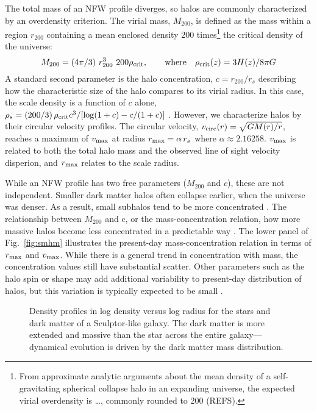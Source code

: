 The total mass of an NFW profile diverges, so halos are commonly
characterized by an overdensity criterion. The virial mass, \(M_{200}\),
is defined as the mass within a region \(r_{200}\) containing a mean
enclosed density 200 times\footnote{From approximate analytic arguments
  about the mean density of a self-gravitating spherical collapse halo
  in an expanding universe, the expected virial overdensity is \ldots,
  commonly rounded to 200 (REFS).} the critical density of the universe:
\begin{equation}{
M_{200} =(4\pi/3) \ r_{200}^3\ 200\rho_{\rm crit}, \qquad {\rm where} \quad \rho_{\rm crit}(z) = 3H(z) / 8\pi G
}\end{equation} A standard second parameter is the halo concentration,
\(c=r_{200} / r_s\) describing how the characteristic size of the halo
compares to its virial radius. In this case, the scale density is a
function of \(c\) alone,
\(\rho_s = (200/3)\,\rho_{\rm crit} c^3 / [\log(1+c) - c/(1+c)]\)
\citep{NFW1996}. However, we characterize halos by their circular
velocity profiles. The circular velocity,
\(v_{\rm circ}(r) = \sqrt{G M(r) / r}\), reaches a maximum of
\(v_{\rm max}\) at radius \(r_{\rm max} = \alpha\,r_s\) where
\(\alpha\approx2.16258\). \(v_{\rm max}\) is related to both the total
halo mass and the observed line of sight velocity disperion, and
\(r_{\rm max}\) relates to the scale radius.

While an NFW profile has two free parameters (\(M_{200}\) and \(c\)),
these are not independent. Smaller dark matter halos often collapse
earlier, when the universe was denser. As a result, small subhalos tend
to be more concentrated \citep[e.g.,][]{NFW1997}. The relationship
between \(M_{200}\) and c, or the mass-concentration relation, how more
massive halos become less concentrated in a predictable way
\citep[e.g.,][]{bullock+2001, ludlow+2016}. The lower panel of
Fig.~\ref{fig:smhm} illustrates the present-day mass-concentration
relation in terms of \(r_{\rm max}\) and \(v_{\rm max}\). While there is
a general trend in concentration with mass, the concentration values
still have substantial scatter. Other parameters such as the halo spin
or shape may add additional variability to present-day distribution of
halos, but this variation is typically expected to be small
\citep{navarro+2010, dicintio+2013, dutton+maccio2014}.

\begin{figure}
\centering
{}
\caption[Example density profiles]{Density profiles in log density
versus log radius for the stars and dark matter of a Sculptor-like
galaxy. The dark matter is more extended and massive than the star
across the entire galaxy---dynamical evolution is driven by the dark
matter mass distribution.}\label{fig:nfw_density}
\end{figure}

